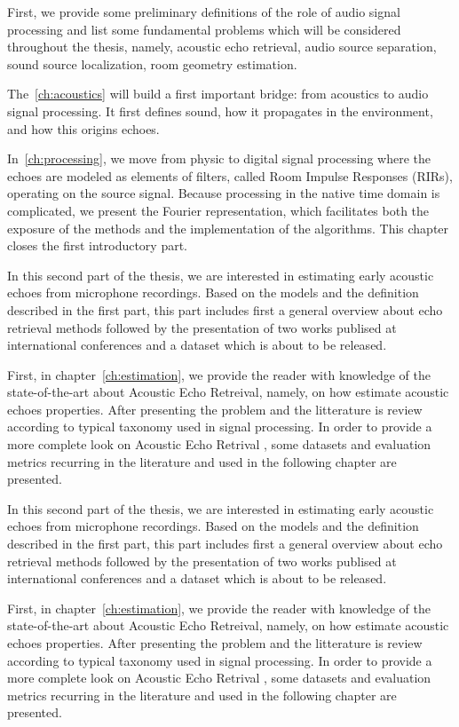 \mynewline
First, we provide some preliminary definitions of the role of audio signal processing and list some fundamental problems which will be considered throughout the thesis, namely, acoustic echo retrieval, audio source separation, sound source localization, room geometry estimation.

The~\cref{ch:acoustics} will build a first important bridge: from acoustics to audio signal processing. It first defines sound, how it propagates in the environment, and how this origins echoes.

In~\cref{ch:processing},  we move from physic to digital signal processing where the echoes are modeled as elements of filters, called Room Impulse Responses (RIRs), operating on the source signal.
Because processing in the native time domain is complicated, we present the Fourier representation, which facilitates both the exposure of the methods and the implementation of the algorithms.
This chapter closes the first introductory part.

In this second part of the thesis, we are interested in estimating early acoustic echoes from microphone recordings. Based on the models and the definition described in the first part, this part includes first a general overview about echo retrieval methods followed by the presentation of two works publised at international conferences and a dataset which is about to be released.

First, in chapter~\cref{ch:estimation}, we provide the reader with knowledge of the state-of-the-art about Acoustic Echo Retreival, namely, on how estimate acoustic echoes properties. After presenting the problem and the litterature is review according to typical taxonomy used in signal processing. In order to provide a more complete look on Acoustic Echo Retrival , some datasets and evaluation metrics recurring in the literature and used in the following chapter are presented.

\mynewline
In this second part of the thesis, we are interested in estimating early acoustic echoes from microphone recordings.
Based on the models and the definition described in the first part, this part includes first a general overview about echo retrieval methods followed by the presentation of two works publised at international conferences and a dataset which is about to be released.

First, in chapter~\cref{ch:estimation}, we provide the reader with knowledge of the state-of-the-art about Acoustic Echo Retreival, namely, on how estimate acoustic echoes properties. After presenting the problem and the litterature is review according to typical taxonomy used in signal processing. In order to provide a more complete look on Acoustic Echo Retrival , some datasets and evaluation metrics recurring in the literature and used in the following chapter are presented.

